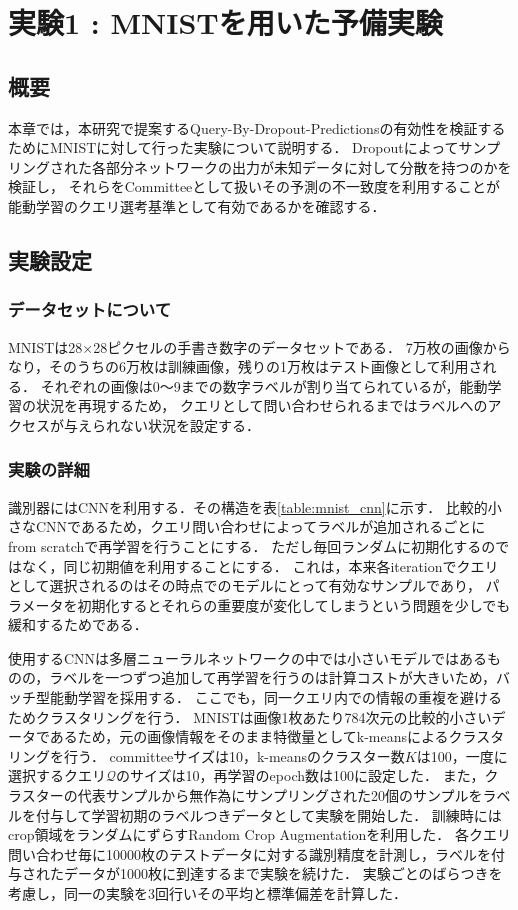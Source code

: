 \chapter{実験1 : MNISTを用いた予備実験}

\section{概要}
本章では，本研究で提案するQuery-By-Dropout-Predictionsの有効性を検証するためにMNISTに対して行った実験について説明する．
Dropoutによってサンプリングされた各部分ネットワークの出力が未知データに対して分散を持つのかを検証し，
それらをCommitteeとして扱いその予測の不一致度を利用することが能動学習のクエリ選考基準として有効であるかを確認する．


\section{実験設定}

\subsection{データセットについて}
MNISTは28×28ピクセルの手書き数字のデータセットである．
7万枚の画像からなり，そのうちの6万枚は訓練画像，残りの1万枚はテスト画像として利用される．
それぞれの画像は0〜9までの数字ラベルが割り当てられているが，能動学習の状況を再現するため，
クエリとして問い合わせられるまではラベルへのアクセスが与えられない状況を設定する．


\subsection{実験の詳細}

識別器にはCNNを利用する．その構造を表\ref{table:mnist_cnn}に示す．
比較的小さなCNNであるため，クエリ問い合わせによってラベルが追加されるごとにfrom scratchで再学習を行うことにする．
ただし毎回ランダムに初期化するのではなく，同じ初期値を利用することにする．
これは，本来各iterationでクエリとして選択されるのはその時点でのモデルにとって有効なサンプルであり，
パラメータを初期化するとそれらの重要度が変化してしまうという問題を少しでも緩和するためである．

使用するCNNは多層ニューラルネットワークの中では小さいモデルではあるものの，ラベルを一つずつ追加して再学習を行うのは計算コストが大きいため，バッチ型能動学習を採用する．
ここでも，同一クエリ内での情報の重複を避けるためクラスタリングを行う．
MNISTは画像1枚あたり784次元の比較的小さいデータであるため，元の画像情報をそのまま特徴量としてk-meansによるクラスタリングを行う．
committeeサイズは10，k-meansのクラスター数$K$は100，一度に選択するクエリ$\mathcal{Q}$のサイズは10，再学習のepoch数は100に設定した．
また，クラスターの代表サンプルから無作為にサンプリングされた20個のサンプルをラベルを付与して学習初期のラベルつきデータとして実験を開始した．
訓練時にはcrop領域をランダムにずらすRandom Crop Augmentationを利用した．
各クエリ問い合わせ毎に10000枚のテストデータに対する識別精度を計測し，ラベルを付与されたデータが1000枚に到達するまで実験を続けた．
実験ごとのばらつきを考慮し，同一の実験を3回行いその平均と標準偏差を計算した．


